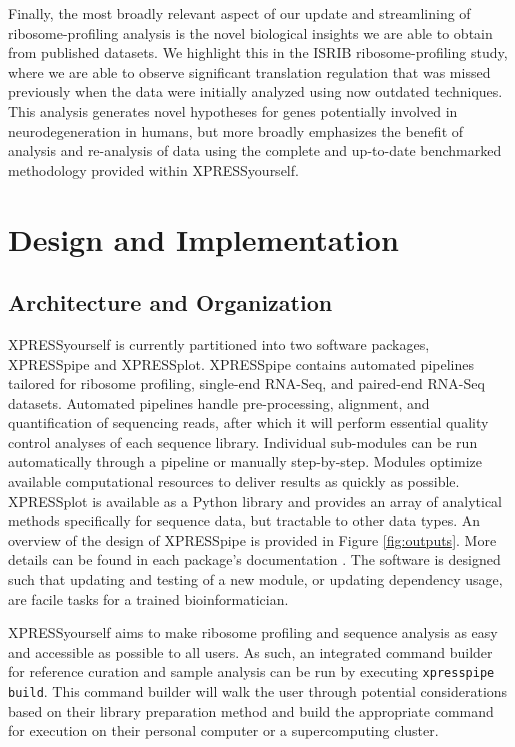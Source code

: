 \documentclass[10pt, oneside]{article}
\begin{document}
Finally, the most broadly relevant aspect of our update and streamlining of ribosome-profiling analysis is the novel biological insights we are able to obtain from published datasets. We highlight this in the ISRIB ribosome-profiling study, where we are able to observe significant translation regulation that was missed previously when the data were initially analyzed using now outdated techniques. This analysis generates novel hypotheses for genes potentially involved in neurodegeneration in humans, but more broadly emphasizes the benefit of analysis and re-analysis of data using the complete and up-to-date benchmarked methodology provided within XPRESSyourself.\\

\section*{Design and Implementation}
\subsection*{Architecture and Organization}
XPRESSyourself is currently partitioned into two software packages, XPRESSpipe and XPRESSplot. XPRESSpipe contains automated pipelines tailored for ribosome profiling, single-end RNA-Seq, and paired-end RNA-Seq datasets. Automated pipelines handle pre-processing, alignment, and quantification of sequencing reads, after which it will perform essential quality control analyses of each sequence library. Individual sub-modules can be run automatically through a pipeline or manually step-by-step. Modules optimize available computational resources to deliver results as quickly as possible. XPRESSplot is available as a Python library and provides an array of analytical methods specifically for sequence data, but tractable to other data types. An overview of the design of XPRESSpipe is provided in Figure \ref{fig:outputs}. More details can be found in each package's documentation \cite{xpresspipe_docs, xpressplot_docs}. The software is designed such that updating and testing of a new module, or updating dependency usage, are facile tasks for a trained bioinformatician.\par

XPRESSyourself aims to make ribosome profiling and sequence analysis as easy and accessible as possible to all users. As such, an integrated command builder for reference curation and sample analysis can be run by executing \texttt{xpresspipe build}. This command builder will walk the user through potential considerations based on their library preparation method and build the appropriate command for execution on their personal computer or a supercomputing cluster.\\
\end{document}
